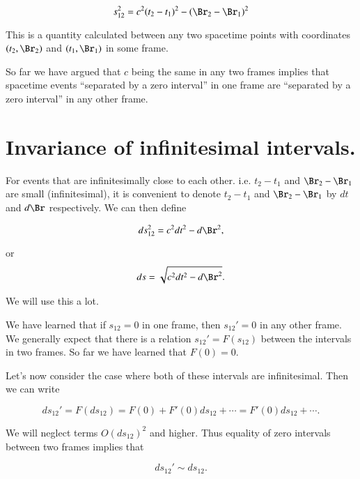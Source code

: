 \begin{equation}\label{eqn:relativisticElectrodynamicsL2:50}
s_{12}^2 = c^2 (t_2 - t_1)^2 - (\Br_2 - \Br_1)^2
\end{equation}

This is a quantity calculated between any two spacetime points with coordinates $(t_2, \Br_2)$ and $(t_1, \Br_1)$ in some frame.

So far we have argued that $c$ being the same in any two frames implies that spacetime events ``separated by a zero interval'' in one frame are ``separated by a zero interval'' in any other frame.

\section{Invariance of infinitesimal intervals.}

For events that are infinitesimally close to each other.  i.e. $t_2 - t_1$ and $\Br_2 -\Br_1$ are small (infinitesimal), it is convenient to denote $t_2 - t_1$ and $\Br_2 - \Br_1$ by $dt$ and $d\Br$ respectively.  We can then define

\begin{equation}\label{eqn:relativisticElectrodynamicsL2:60}
ds_{12}^2 = c^2 dt^2 - d\Br^2,
\end{equation}

or
\begin{equation}\label{eqn:relativisticElectrodynamicsL2:60b}
ds= \sqrt{c^2 dt^2 - d\Br^2}.
\end{equation}

We will use this a lot.

We have learned that if $s_{12} = 0$ in one frame, then $s_{12}' = 0$ in any other frame.  We generally expect that there is a relation $s_{12}' = F(s_12)$ between the intervals in two frames.  So far we have learned that $F(0) = 0$. 

Let's now consider the case where both of these intervals are infinitesimal.  Then we can write

\begin{equation}\label{eqn:relativisticElectrodynamicsL2:70}
ds_{12}' = F(ds_{12}) = F(0) + F'(0) ds_{12} + \cdots = F'(0) ds_{12} + \cdots.
\end{equation}

We will neglect terms $O(ds_{12})^2$ and higher.  Thus equality of zero intervals between two frames implies that 

\begin{equation}\label{eqn:relativisticElectrodynamicsL2:80}
ds_{12}' \sim ds_{12}.
\end{equation}


